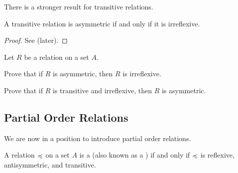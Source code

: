 There is a stronger result for transitive relations.

\begin{proposition}\label{prop:asymmetric-iff-irreflexive-for-transitive}
    A transitive relation is asymmetric if and only if it is irreflexive.
\end{proposition}
\begin{proof}
    See  (later).
\end{proof}

\begin{exercise}\label{exercise:asymmetric-iff-irreflexive-for-transitive}
    Let $R$ be a relation on a set $A$.
    \begin{partquestions}{\alph*}
        \item Prove that if $R$ is asymmetric, then $R$ is irreflexive.
        \item Prove that if $R$ is transitive and irreflexive, then $R$ is asymmetric.
    \end{partquestions}
\end{exercise}

\subsection{Partial Order Relations}
We are now in a position to introduce partial order relations.

\begin{definition}
    A relation $\preccurlyeq$ on a set $A$ is a  (also known as a ) if and only if $\preccurlyeq$ is reflexive, antisymmetric, and transitive.
\end{definition}

